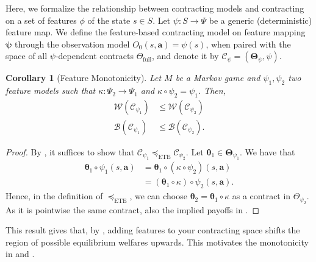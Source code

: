 \documentclass[referee,sn-basic]{sn-jnl}
\newcommand{\bld}[1]{\boldsymbol{#1}}
\newcommand{\btheta}{\boldsymbol{\theta}}
\newcommand{\bTheta}{\boldsymbol{\Theta}}
\theoremstyle{thmstyleone}%
\newtheorem{corollary}[theorem]{Corollary}
\theoremstyle{thmstyletwo}%
\theoremstyle{thmstylethree}%
\begin{document}
Here, we formalize the relationship between contracting models and contracting on a set of features $\phi$ of the state $s \in S$. Let $\psi: S \to \Psi$ be a generic (deterministic) feature map. We define the feature-based contracting model on feature mapping $\bld \psi$ through the observation model $O_0 (s, \mathbf a) = \psi (s)$, when paired with the space of all $\psi$-dependent contracts $\Theta_{\operatorname{full}}$, and denote it by $\mathcal C_{\psi} = (\bTheta_{\psi}, \psi)$.
\begin{corollary}[Feature Monotonicity]\label{thm:feature_monotonicity}
    Let $M$ be a Markov game and $\psi_1, \psi_2$ two feature models such that $\kappa: \Psi_2 \to \Psi_1$ and $\kappa \circ \psi_2 = \psi_1$. Then,
    \begin{align*}
    \mathcal{W}(\mathcal{C}_{\psi_1}) &\le \mathcal{W}(\mathcal{C}_{\psi_2})\\
    \mathcal{B}(\mathcal{C}_{\psi_1}) &\le \mathcal{B}(\mathcal{C}_{\psi_2}).
    \end{align*}
\end{corollary}
\begin{proof}
    By , it suffices to show that $\mathcal{C}_{\psi_1} \preceq_{\operatorname{ETE}} \mathcal{C}_{\psi_2}$. Let $\btheta_1 \in \bTheta_{\psi_1}$. We have that 
    \begin{align*}
        \btheta_{1} \circ \psi_1 (s, \mathbf a) 
        &= \btheta_{1} \circ (\kappa \circ \psi_2) (s, \mathbf a)\\
        &= (\btheta_{1} \circ \kappa) \circ \psi_2 (s, \mathbf a).
    \end{align*}
    Hence, in the definition of $\preceq_{\text{ETE}}$, we can choose $\btheta_{2} = \btheta_{1} \circ \kappa$ as a contract in $\Theta_{\psi_2}$. As it is pointwise the same contract, also the implied payoffs in .
\end{proof}
This result gives that, by , adding features to your contracting space shifts the region of possible equilibrium welfares upwards. This motivates the monotonicity in  and . 
\end{document}
